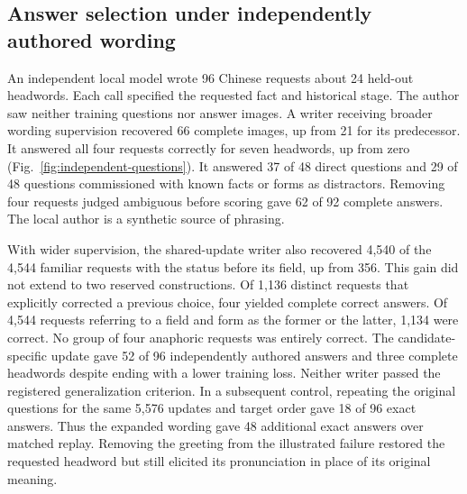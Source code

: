 \subsection*{Answer selection under independently authored wording}
An independent local model wrote 96 Chinese requests about 24 held-out headwords. Each call specified the requested fact and historical stage. The author saw neither training questions nor answer images. A writer receiving broader wording supervision recovered 66 complete images, up from 21 for its predecessor. It answered all four requests correctly for seven headwords, up from zero (Fig.~\ref{fig:independent-questions}). It answered 37 of 48 direct questions and 29 of 48 questions commissioned with known facts or forms as distractors. Removing four requests judged ambiguous before scoring gave 62 of 92 complete answers. The local author is a synthetic source of phrasing.

With wider supervision, the shared-update writer also recovered 4,540 of the 4,544 familiar requests with the status before its field, up from 356. This gain did not extend to two reserved constructions. Of 1,136 distinct requests that explicitly corrected a previous choice, four yielded complete correct answers. Of 4,544 requests referring to a field and form as the former or the latter, 1,134 were correct. No group of four anaphoric requests was entirely correct. The candidate-specific update gave 52 of 96 independently authored answers and three complete headwords despite ending with a lower training loss. Neither writer passed the registered generalization criterion. In a subsequent control, repeating the original questions for the same 5,576 updates and target order gave 18 of 96 exact answers. Thus the expanded wording gave 48 additional exact answers over matched replay. Removing the greeting from the illustrated failure restored the requested headword but still elicited its pronunciation in place of its original meaning.
